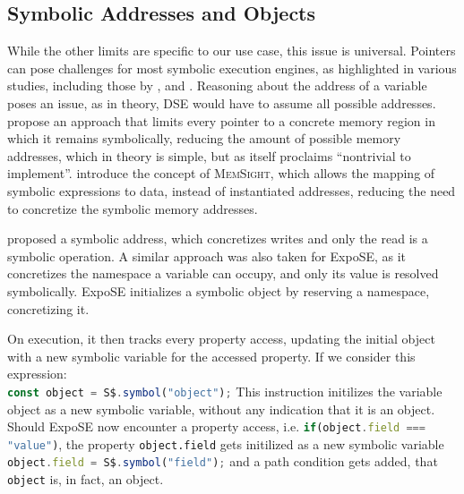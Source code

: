 \subsection{Symbolic Addresses and Objects}
\label{sec:sym-obj}
While the other limits are specific to our use case, this issue is universal. Pointers can pose challenges for most symbolic execution engines, as highlighted in various studies, including those by \citet{cha_unleashing_2012}, \citet{coppa_rethinking_2017} and \citet{elkarablieh_precise_2009}.
Reasoning about the address of a variable poses an issue, as in theory, DSE would have to assume all possible addresses. 
\citet{elkarablieh_precise_2009} propose an approach that limits every pointer to a concrete memory region in which it remains symbolically, reducing the amount of possible memory addresses, which in theory is simple, but as itself proclaims “nontrivial to implement”. 
\citet{coppa_rethinking_2017} introduce the concept of \textsc{MemSight}, which allows the mapping of symbolic expressions to data, instead of instantiated addresses, reducing the need to concretize the symbolic memory addresses. 

\citet{cha_unleashing_2012} proposed a symbolic address, which concretizes writes and only the read is a symbolic operation. 
A similar approach was also taken for ExpoSE, as it concretizes the namespace a variable can occupy, and only its value is resolved symbolically.
ExpoSE initializes a symbolic object by reserving a namespace, concretizing it.


On execution, it then tracks every property access, updating the initial object with a new symbolic variable for the accessed property. 
If we consider this expression:\\
\lstinline[language=JavaScript, gobble=4, escapechar=@]{const object = S$.symbol("object");}
This instruction initilizes the variable object as a new symbolic variable, without any indication that it is an object. 
Should ExpoSE now encounter a property access, i.e.
\lstinline[language=JavaScript, gobble=4, escapechar=@]{if(object.field === "value")},
the property \lstinline{object.field} gets initilized as a new symbolic variable
\lstinline[language=JavaScript, gobble=4, escapechar=@]{object.field = S$.symbol("field");} 
and a path condition gets added, that \lstinline{object} is, in fact, an object.\cite{loring_systematic_2021}


